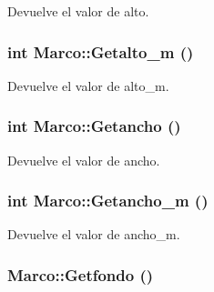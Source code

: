 Devuelve el valor de alto. 

\hypertarget{class_marco_b455df2241cf007082274fb98afdb40b}{
\subsubsection[{Getalto\_\-m}]{\setlength{\rightskip}{0pt plus 5cm}int Marco::Getalto\_\-m ()}}
\label{class_marco_b455df2241cf007082274fb98afdb40b}


Devuelve el valor de alto\_\-m. 

\hypertarget{class_marco_ba1d30d14a08d67e48bb99c894fc3e78}{
\subsubsection[{Getancho}]{\setlength{\rightskip}{0pt plus 5cm}int Marco::Getancho ()}}
\label{class_marco_ba1d30d14a08d67e48bb99c894fc3e78}


Devuelve el valor de ancho. 

\hypertarget{class_marco_9a77bdba78c4e8551be782eb98fcb3ec}{
\subsubsection[{Getancho\_\-m}]{\setlength{\rightskip}{0pt plus 5cm}int Marco::Getancho\_\-m ()}}
\label{class_marco_9a77bdba78c4e8551be782eb98fcb3ec}


Devuelve el valor de ancho\_\-m. 

\hypertarget{class_marco_b4d013f6b33c4c1ab7f8f91abd70a200}{
\subsubsection[{Getfondo}]{ Marco::Getfondo ()}}
\label{class_marco_b4d013f6b33c4c1ab7f8f91abd70a200}


